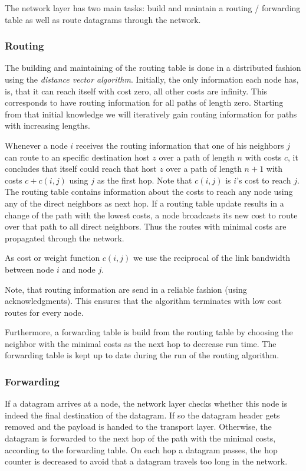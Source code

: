   The network layer has two main tasks: build and maintain a routing / forwarding table as well as route datagrams through the network. 

  \subsubsection{Routing}
  The building and maintaining of the routing table is done in a distributed fashion using the \emph{distance vector algorithm}. Initially, the only information each node has, is, that it can reach itself with cost zero, all other costs are infinity. This corresponds to have routing information for all paths of length zero. Starting from that initial knowledge we will iteratively gain routing information for paths with increasing lengths.

  Whenever a node $i$ receives the routing information that one of his neighbors $j$ can route to an specific destination host $z$ over a path of length $n$ with costs $c$, it concludes that itself could reach that host $z$ over a path of length $n+1$ with costs $c+c(i,j)$ using $j$ as the first hop. Note that $c(i,j)$ is $i$'s cost to reach $j$. The routing table contains information about the costs to reach any node using any of the direct neighbors as next hop. If a routing table update results in a change of the path with the lowest costs, a node broadcasts its new cost to route over that path to all direct neighbors. Thus the routes with minimal costs are propagated through the network.

  As cost or weight function $c(i,j)$ we use the reciprocal of the link bandwidth between node $i$ and node $j$. 

  Note, that routing information are send in a reliable fashion (using acknowledgments). This ensures that the algorithm terminates with low cost routes for every node.

  Furthermore, a forwarding table is build from the routing table by choosing the neighbor with the minimal costs as the next hop to decrease run time. The forwarding table is kept up to date during the run of the routing algorithm.

  \subsubsection{Forwarding}
  If a datagram arrives at a node, the network layer checks whether this node is indeed the final destination of the datagram. If so the datagram header gets removed and the payload is handed to the transport layer. Otherwise, the datagram is forwarded to the next hop of the path with the minimal costs, according to the forwarding table. On each hop a datagram passes, the hop counter is decreased to avoid that a datagram travels too long in the network.





